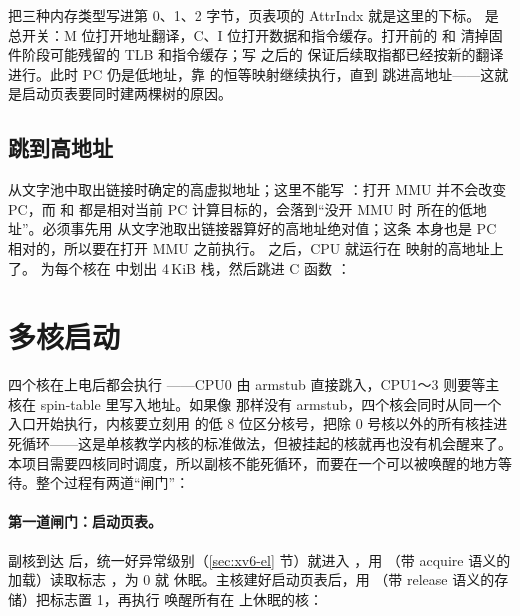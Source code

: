  把三种内存类型写进第 0、1、2 字节，页表项的 AttrIndx 就是这里的下标。 是总开关：M 位打开地址翻译，C、I 位打开数据和指令缓存。打开前的  和  清掉固件阶段可能残留的 TLB 和指令缓存；写  之后的  保证后续取指都已经按新的翻译进行。此时 PC 仍是低地址，靠  的恒等映射继续执行，直到  跳进高地址——这就是启动页表要同时建两棵树的原因。

\subsection{跳到高地址}

 从文字池中取出链接时确定的高虚拟地址；这里不能写 ：打开 MMU 并不会改变 PC，而  和  都是相对当前 PC 计算目标的，会落到“没开 MMU 时  所在的低地址”。必须事先用  从文字池取出链接器算好的高地址绝对值；这条  本身也是 PC 相对的，所以要在打开 MMU 之前执行。 之后，CPU 就运行在  映射的高地址上了。 为每个核在  中划出 4\,KiB 栈，然后跳进 C 函数 ：


\section{多核启动}
\label{sec:smp-boot}

四个核在上电后都会执行 ——CPU0 由 armstub 直接跳入，CPU1～3 则要等主核在 spin-table 里写入地址。如果像  那样没有 armstub，四个核会同时从同一个入口开始执行，内核要立刻用  的低 8 位区分核号，把除 0 号核以外的所有核挂进死循环——这是单核教学内核的标准做法，但被挂起的核就再也没有机会醒来了。本项目需要四核同时调度，所以副核不能死循环，而要在一个可以被唤醒的地方等待。整个过程有两道“闸门”：

\paragraph{第一道闸门：启动页表。} 副核到达  后，统一好异常级别（\ref{sec:xv6-el} 节）就进入 ，用 （带 acquire 语义的加载）读取标志 ，为 0 就  休眠。主核建好启动页表后，用 （带 release 语义的存储）把标志置 1，再执行  唤醒所有在  上休眠的核：

